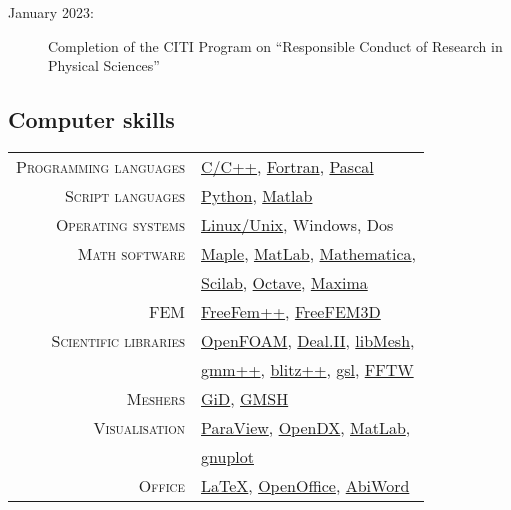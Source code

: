 \documentclass[final, a4paper, oneside, 12pt]{article}
\numberwithin{equation}{section}
\begin{document}
\begin{description}

  \item[January 2023:] Completion of the CITI Program on ``Responsible Conduct of Research in Physical Sciences''

\end{description}


\subsection{Computer skills}

\begin{tabular}{rl}

        \textsc{Programming languages} & 
        \href{http://en.wikipedia.org/wiki/C++}{C/C++},
        \href{http://en.wikipedia.org/wiki/Fortran}{Fortran},
    \href{http://en.wikipedia.org/wiki/Pascal_(programming_language)}{Pascal} \\
    	  \textsc{Script languages} & \href{http://www.python.org/}{Python}, 
    	  \href{http://www.mathworks.com/}{Matlab} \\
        \textsc{Operating systems} & 
        \href{http://www.ubuntu.com/}{Linux/Unix}, Windows, Dos \\
        \textsc{Math software} & \href{http://www.maplesoft.com/}{Maple}, 
        \href{http://www.mathworks.com/}{MatLab}, 
        \href{http://www.wolfram.com/}{Mathematica}, \\
        & \href{http://www.scilab.org/}{Scilab},
        \href{http://www.gnu.org/software/octave/}{Octave},
        \href{http://maxima.sourceforge.net/}{Maxima} \\
        \textsc{FEM} & 
        \href{http://www.freefem.org/ff++/index.htm}{FreeFem++}, 
        \href{http://www.freefem.org/ff3d/index.html}{FreeFEM3D} \\
        \textsc{Scientific libraries} & \href{http://www.opencfd.co.uk/openfoam/}{OpenFOAM}, \href{http://www.dealii.org/}{Deal.II}, 
        \href{http://libmesh.sourceforge.net/}{libMesh}, \\
        & \href{http://www-gmm.insa-toulouse.fr/getfem/gmm_intro}{gmm++},
        \href{http://www.oonumerics.org/blitz/}{blitz++},
        \href{http://www.gnu.org/software/gsl/}{gsl},
        \href{http://www.fftw.org/}{FFTW} \\
        \textsc{Meshers} & \href{http://gid.cimne.upc.es/}{GiD}, 
        \href{http://geuz.org/gmsh/}{GMSH} \\
        \textsc{Visualisation} & \href{http://www.paraview.org/}{ParaView}, \href{http://www.opendx.org/}{OpenDX}, \href{http://www.mathworks.com/}{MatLab}, \\
        & \href{http://www.gnuplot.info/}{gnuplot} \\
        \textsc{Office} & \href{http://www.latex-project.org/}{\LaTeX},
        \href{http://www.openoffice.org/}{OpenOffice},
        \href{http://www.abisource.com/}{AbiWord}

\end{tabular}
\end{document}
